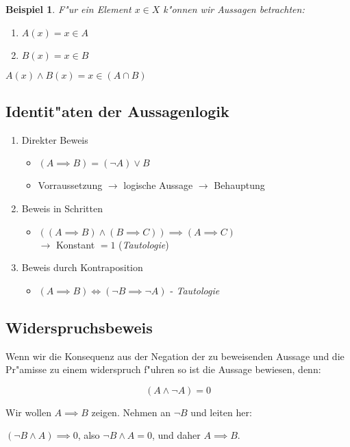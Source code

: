 \documentclass[11pt]{article}
\newtheorem{exa}{Beispiel}[section]
\begin{document}
\begin{exa}
F"ur ein Element \(x\in X\) k"onnen wir Aussagen betrachten:
\begin{enumerate}
\item \(A(x)=x\in A\)
\item \(B(x)=x\in B\)
\end{enumerate}
\(A(x)\wedge B(x)=x\in (A\cap B)\)
\end{exa}

\subsection{Identit"aten der Aussagenlogik}
\label{sec:orgd743b6e}
\begin{relation}
\begin{enumerate}
\item Direkter Beweis 
\begin{itemize}
\item \((A\implies B) = (\neg A)\vee B\)
\item Vorraussetzung \(\rightarrow\) logische Aussage \(\rightarrow\) Behauptung
\end{itemize}
\item Beweis in Schritten
\begin{itemize}
\item \(((A\implies B)\wedge (B\implies C))\implies (A\implies C)\) \\
\(\rightarrow\) Konstant \(=1\) (\emph{Tautologie})
\end{itemize}
\item Beweis durch Kontraposition
\begin{itemize}
\item \((A\implies B) \iff (\neg B \implies \neg A)\) - \emph{Tautologie}
\end{itemize}
\end{enumerate}
\end{relation}

\subsection{Widerspruchsbeweis}
\label{sec:org54c9d02}
Wenn wir die Konsequenz aus der Negation der zu beweisenden Aussage und die
Pr"amisse zu einem widerspruch f"uhren so ist die Aussage bewiesen, denn:
\begin{relation}
\[(A\wedge \neg A)=0\]
\end{relation}


Wir wollen \(A\implies B\) zeigen.
Nehmen an \(\neg B\) und leiten her:\\
\begin{relation}
\((\neg B \wedge A)\implies 0\), also \(\neg B\wedge A = 0\), und daher \(A\implies
B\).
\end{relation}
\end{document}
